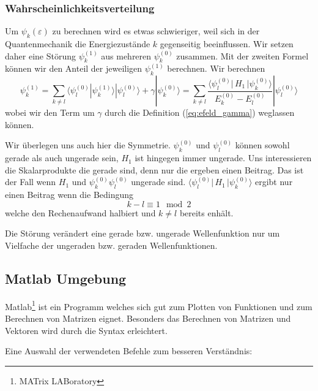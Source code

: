 \begin{refsection}
\subsubsection{Wahrscheinlichkeitsverteilung}

Um $\psi_k(\varepsilon)$ zu berechnen wird es etwas schwieriger,
weil sich in der Quantenmechanik die Energiezust\"ande $k$ gegenseitig beeinflussen.
Wir setzen daher eine St\"orung $\psi_k^{(1)}$ aus mehreren $\psi_k^{(0)}$ zusammen.
Mit der zweiten Formel k\"onnen wir den Anteil der jeweiligen $\psi_k^{(1)}$ berechnen.
Wir berechnen 
\[
\psi_k^{(1)} =
\sum_{k\ne l}
\langle\psi_l^{(0)}|\psi_k^{(1)}\rangle |\psi_l^{(0)}\rangle + \gamma|\psi_k^{(0)}\rangle
=
\sum_{k\ne l}
\frac{\langle \psi_l^{(0)}|\, H_1 \,|\psi_k^{(0)}\rangle}{E_k^{(0)}-E_l^{(0)}} |\psi_l^{(0)}\rangle
\]
wobei wir den Term um $\gamma$ durch die Definition (\ref{eq:efeld_gamma}) weglassen k\"onnen.

Wir \"uberlegen uns auch hier die Symmetrie.
$\psi_k^{(0)}$ und $\psi_l^{(0)}$ k\"onnen sowohl gerade als auch ungerade sein,
$H_1$ ist hingegen immer ungerade.
Uns interessieren die Skalarprodukte die gerade sind, denn nur die ergeben einen Beitrag.
Das ist der Fall wenn $H_1$ und $\psi_k^{(0)} \psi_l^{(0)}$ ungerade sind.
$\langle \psi_l^{(0)}|\, H_1 \,|\psi_k^{(0)}\rangle$ ergibt nur einen Beitrag wenn die Bedingung
\begin{equation}
  \label{eq:efeld_summebedingung}
  k-l \equiv 1 \mod 2
\end{equation}
welche den Rechenaufwand halbiert und $k \ne l$ bereits enh\"alt.
\begin{result}
Die St\"orung ver\"andert eine gerade bzw. ungerade Wellenfunktion nur um 
Vielfache der ungeraden bzw. geraden Wellenfunktionen.
\end{result}



\subsection{Matlab Umgebung}

Matlab\footnote{MATrix LABoratory} ist ein Programm welches sich gut zum Plotten von Funktionen
und zum Berechnen von Matrizen eignet.
Besonders das Berechnen von Matrizen und Vektoren wird durch die Syntax erleichtert.

Eine Auswahl der verwendeten Befehle zum besseren Verst\"andnis:


\end{refsection}
